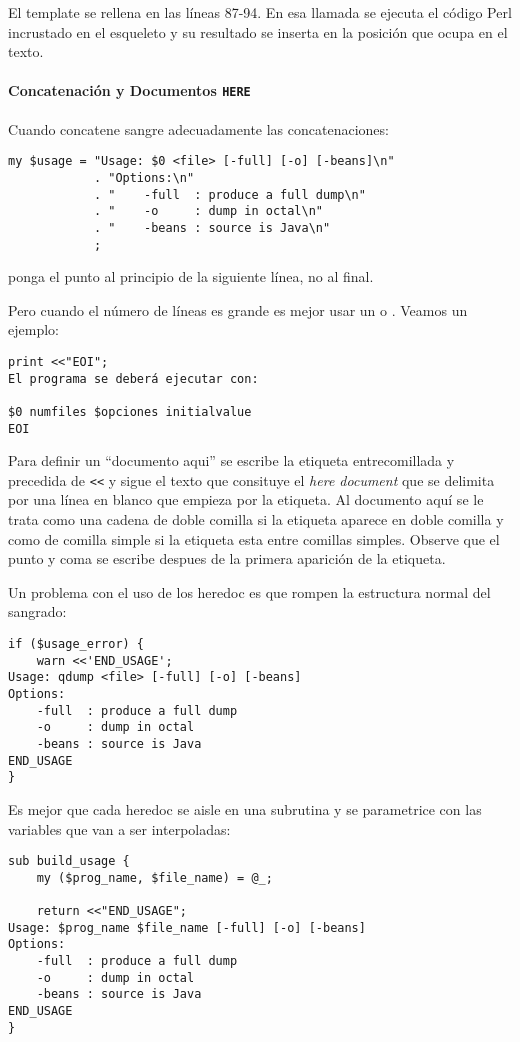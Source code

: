 El template se rellena en las líneas 87-94. En esa llamada
se ejecuta el código Perl incrustado en el esqueleto
y su resultado se inserta en la posición que ocupa en el texto.

\paragraph{Concatenación y Documentos {\tt HERE}}
Cuando concatene sangre adecuadamente las concatenaciones:
\begin{verbatim}
my $usage = "Usage: $0 <file> [-full] [-o] [-beans]\n"
            . "Options:\n"
            . "    -full  : produce a full dump\n"
            . "    -o     : dump in octal\n"
            . "    -beans : source is Java\n"
            ;
\end{verbatim}
ponga el punto al principio de la siguiente línea, no al final.

Pero cuando el número de líneas es grande 
es mejor
usar un 
o . Veamos un ejemplo:
\begin{verbatim}
print <<"EOI";
El programa se deberá ejecutar con:

$0 numfiles $opciones initialvalue
EOI
\end{verbatim}
Para definir un ``documento aqui'' 
se escribe la etiqueta entrecomillada y precedida de \verb|<<| y 
sigue el texto que consituye el \emph{here document}
que se delimita por una línea en blanco que empieza por la etiqueta.
Al documento aquí se le trata como una cadena de doble comilla si
la etiqueta aparece en doble comilla y como de comilla simple
si la etiqueta esta  entre comillas simples.
Observe que el punto y coma se escribe despues 
de la primera aparición 
de la etiqueta.

Un problema con el uso de los heredoc es que rompen la estructura normal
del sangrado:
\begin{verbatim}
if ($usage_error) {
    warn <<'END_USAGE';
Usage: qdump <file> [-full] [-o] [-beans]
Options:
    -full  : produce a full dump
    -o     : dump in octal
    -beans : source is Java
END_USAGE
}
\end{verbatim}
Es mejor que cada heredoc se aisle en una subrutina y se parametrice con
las variables que van a ser interpoladas:
\begin{verbatim}
sub build_usage {
    my ($prog_name, $file_name) = @_;

    return <<"END_USAGE";
Usage: $prog_name $file_name [-full] [-o] [-beans]
Options:
    -full  : produce a full dump
    -o     : dump in octal
    -beans : source is Java
END_USAGE
}
\end{verbatim}

